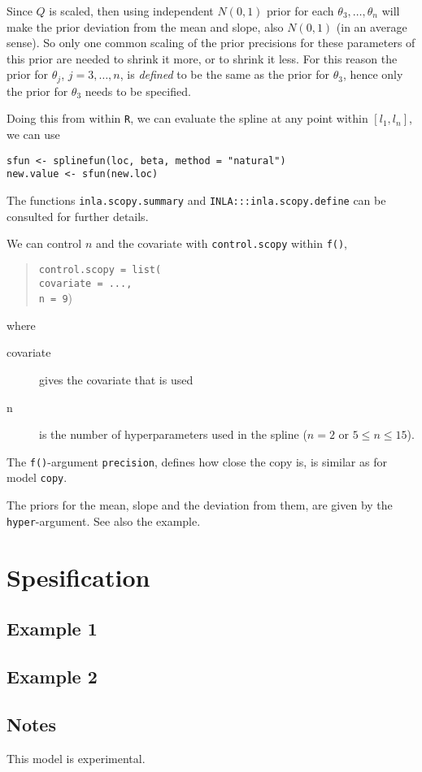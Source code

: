 \documentclass[a4paper,11pt]{article}
\begin{document}
Since $Q$ is scaled, then using independent $N(0,1)$ prior for each
$\theta_{3}, \ldots, \theta_n$ will make the prior deviation from the
mean and slope, also $N(0,1)$ (in an average sense). So only one
common scaling of the prior precisions for these parameters of this
prior are needed to shrink it more, or to shrink it less. For this
reason the prior for $\theta_{j}$, $j=3, \ldots, n$, is \emph{defined}
to be the same as the prior for $\theta_3$, hence only the prior for
$\theta_3$ needs to be specified.

Doing this from within \texttt{R}, we can evaluate the spline at any
point within $[l_1, l_n]$, we can use
\begin{verbatim}
sfun <- splinefun(loc, beta, method = "natural")
new.value <- sfun(new.loc)
\end{verbatim}
The functions \texttt{inla.scopy.summary} and
\texttt{INLA:::inla.scopy.define} can be consulted for further
details.


We can control $n$ and the covariate with
\texttt{control.scopy} within \texttt{f()},
\begin{quote}
    \texttt{control.scopy = list(\\
        covariate = ..., \\
        n = 9})
\end{quote}
where
\begin{description}
\item[covariate] gives the covariate that is used
\item[n] is the number of hyperparameters used in the spline
    ($n=2$ or $5 \leq n \leq 15$).
\end{description}
The \texttt{f()}-argument \texttt{precision}, defines how close the
copy is, is similar as for model \texttt{copy}.

The priors for the mean, slope and the deviation from them, are given
by the \texttt{hyper}-argument. See also the example.

\clearpage
\section*{Spesification}


\clearpage
\subsection*{Example 1}
{\small}
\subsection*{Example 2}
{\small}

\subsection*{Notes}

This model is experimental.
\end{document}
